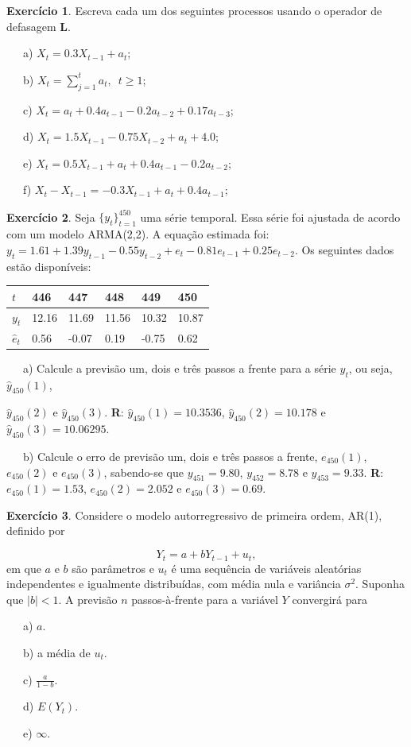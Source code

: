 \documentclass[
]{book}
\theoremstyle{definition}
\theoremstyle{definition}
\theoremstyle{definition}
\newtheorem{exercise}{Exercício}[chapter]
\theoremstyle{remark}
\begin{document}
\begin{exercise}
\protect\hypertarget{exr:exerarma2}{}{\label{exr:exerarma2} }Escreva cada um dos seguintes processos usando o operador de defasagem \textbf{L}.

~~~a) \(X_t=0.3X_{t-1}+a_t\);

~~~b) \(X_t=\sum_{j=1}^{t}a_t,\,\,\, t\geq 1\);

~~~c) \(X_t=a_t+0.4a_{t-1}-0.2a_{t-2}+0.17a_{t-3}\);

~~~d) \(X_t=1.5X_{t-1}-0.75X_{t-2}+a_t+4.0\);

~~~e) \(X_t=0.5X_{t-1}+a_t+0.4a_{t-1}-0.2a_{t-2}\);

~~~f) \(X_t-X_{t-1}=-0.3X_{t-1}+a_t+0.4a_{t-1}\);
\end{exercise}

\begin{exercise}
\protect\hypertarget{exr:exarma22}{}{\label{exr:exarma22} }Seja \(\{y_t\}_{t=1}^{450}\) uma série temporal. Essa série foi ajustada de acordo com um modelo ARMA(2,2). A equação estimada
foi: \(y_t=1.61+1.39y_{t-1}-0.55y_{t-2}+e_t-0.81e_{t-1}+0.25e_{t-2}\). Os seguintes dados estão disponíveis:

\begin{longtable}[]{@{}llllll@{}}
\toprule
\(t\) & 446 & 447 & 448 & 449 & 450\tabularnewline
\midrule
\endhead
\(y_t\) & 12.16 & 11.69 & 11.56 & 10.32 & 10.87\tabularnewline
\(\widehat{e}_t\) & 0.56 & -0.07 & 0.19 & -0.75 & 0.62\tabularnewline
\bottomrule
\end{longtable}

~~~a) Calcule a previsão um, dois e três passos a frente para a série \(y_t\), ou seja, \(\widehat{y}_{450}(1)\),

\(\widehat{y}_{450}(2)\) e \(\widehat{y}_{450}(3)\). \textbf{R}: \(\widehat{y}_{450}(1)=10.3536\), \(\widehat{y}_{450}(2)=10.178\) e
\(\widehat{y}_{450}(3)=10.06295\).

~~~b) Calcule o erro de previsão um, dois e três passos a frente, \(e_{450}(1)\), \(e_{450}(2)\) e \(e_{450}(3)\), sabendo-se que \(y_{451}=9.80\), \(y_{452}=8.78\) e \(y_{453}=9.33\). \textbf{R}: \(e_{450}(1)=1.53\), \(e_{450}(2)=2.052\) e \(e_{450}(3)=0.69\).
\end{exercise}

\begin{exercise}
\protect\hypertarget{exr:exear1}{}{\label{exr:exear1} }Considere o modelo autorregressivo de primeira ordem, AR(1), definido por

\[Y_t=a+bY_{t-1}+u_t,\]
em que \(a\) e \(b\) são parâmetros e \(u_t\) é uma sequência de variáveis aleatórias independentes e igualmente distribuídas, com média nula e variância \(\sigma^2\). Suponha que \(|b| < 1\). A previsão \(n\) passos-à-frente para a variável \(Y\) convergirá para

~~~a) \(a\).

~~~b) a média de \(u_t\).

~~~c) \(\frac{a}{1-b}\).

~~~d) \(E(Y_t)\).

~~~e) \(\infty\).
\end{exercise}
\end{document}

